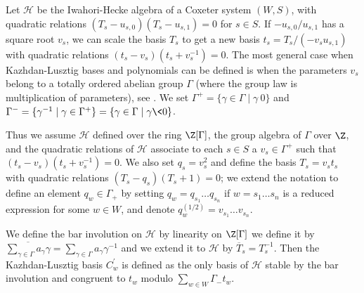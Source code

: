 \newcommand\cH{{\mathcal H}}
\newcommand\cC{{\mathcal C}}
\newcommand\ca{{\mathcal a}}
\newcommand\cA{{\mathcal A}}

Let  $\cH$ be the  Iwahori-Hecke algebra of  a Coxeter system $(W,S)$, with
quadratic   relations  $(T_s-u_{s,0})(T_s-u_{s,1})=0$  for   $s\in  S$.  If
$-u_{s,0}/u_{s,1}$ has a square root $v_s$, we can scale the basis $T_s$ to
get   a  new   basis  $t_s=T_s/(-v_s u_{s,1})$  with   quadratic  relations
$(t_s-v_s)(t_s+v_s^{-1})=0$.  The  most  general  case when Kazhdan-Lusztig
bases and polynomials can be defined is when the parameters $v_s$ belong to
a   totally  ordered  abelian  group  $\Gamma$  (where  the  group  law  is
multiplication   of  parameters),  see   \cite{Lus83}.  We  set  $\Gamma^+=
\{\gamma\in\Gamma\mid    \gamma\>0\}$    and    $\Gamma^-=    \{\gamma^{-1}
\mid\gamma\in\Gamma^+\} =\{\gamma\in\Gamma\mid \gamma\<0\}$.

Thus  we assume $\cH$ defined over the ring $\Z[\Gamma]$, the group algebra
of  $\Gamma$ over $\Z$,  and the quadratic  relations of $\cH$ associate to
each  $s\in S$ a $v_s\in\Gamma^+$ such that $(t_s-v_s)(t_s+v_s^{-1})=0$. We
also  set  $q_s=v_s^2$  and  define the basis  $T_s=v_s t_s$ with quadratic
relations $(T_s-q_s)(T_s+1)=0$; we extend the notation to define an element
$q_w\in\Gamma_+$  by  setting  $q_w=q_{s_1}\ldots  q_{s_n}$ if $w=s_1\ldots
s_n$ is a reduced expression for some $w\in W$, and denote
$q_w^{(1/2)}=v_{s_1}\ldots    v_{s_n}$.   

We  define the  bar involution  on $\cH$  by linearity\: on $\Z[\Gamma]$ we
define      it     by     $\overline{\sum_{\gamma\in\Gamma}a_\gamma\gamma}=
\sum_{\gamma\in\Gamma}  a_\gamma \gamma^{-1}$ and we  extend it to $\cH$ by
$\overline  T_s=T_s^{-1}$. Then  the Kazhdan-Lusztig  basis $C^\prime_w$ is
defined  as  the  only  basis  of  $\cH$  stable  by the bar involution and
congruent to $t_w$ modulo $\sum_{w\in W}\Gamma_- t_w$.

